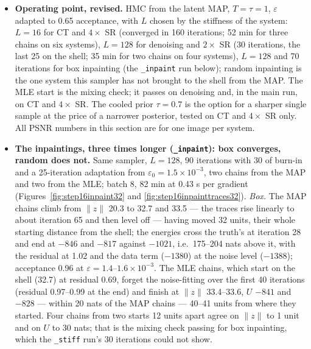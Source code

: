 \documentclass[11pt]{article}
\begin{document}
\begin{itemize}
  \item \textbf{Operating point, revised.} HMC from the latent MAP, $T =
        \tau = 1$, $\varepsilon$ adapted to 0.65 acceptance, with $L$
        chosen by the stiffness of the system: $L = 16$ for CT and
        $4\times$ SR (converged in 160 iterations; 52 min for three chains
        on six systems), $L = 128$ for denoising and $2\times$ SR (30
        iterations, the last 25 on the shell; 35 min for two chains on
        four systems), $L = 128$ and 70 iterations for box inpainting
        (the \texttt{\_inpaint} run below); random inpainting is the one
        system this sampler has not brought to the shell from the MAP. The
        MLE start is the mixing check; it passes on denoising and, in the
        main run, on CT and $4\times$ SR. The cooled prior $\tau = 0.7$ is
        the option for a sharper single sample at the price of a narrower
        posterior, tested on CT and $4\times$ SR only. All PSNR numbers in
        this section are for one image per system.
  \item \textbf{The inpaintings, three times longer (\texttt{\_inpaint}):
        box converges, random does not.} Same sampler, $L = 128$, 90
        iterations with 30 of burn-in and a 25-iteration adaptation from
        $\varepsilon_0 = 1.5 \times 10^{-3}$, two chains from the MAP and
        two from the MLE; batch 8, 82 min at 0.43 s per gradient
        (Figures~\ref{fig:step16inpaint32} and \ref{fig:step16inpainttraces32}).
        \emph{Box.} The MAP chains climb from $\|z\|$ 20.3 to 32.7 and
        33.5 --- the traces rise linearly to about iteration 65 and then
        level off --- having moved 32 units, their whole starting distance
        from the shell; the energies cross the truth's at iteration 28 and
        end at $-846$ and $-817$ against $-1021$, i.e.\ 175--204 nats above
        it, with the residual at 1.02 and the data term ($-1380$) at the
        noise level ($-1388$); acceptance 0.96 at $\varepsilon = 1.4$--$1.6
        \times 10^{-3}$. The MLE chains, which start on the shell (32.7) at
        residual 0.69, forget the noise-fitting over the first 40
        iterations (residual 0.97--0.99 at the end) and finish at $\|z\|$
        33.4--33.6, $U$ $-841$ and $-828$ --- within 20 nats of the MAP
        chains --- 40--41 units from where they started. Four chains from
        two starts 12 units apart agree on $\|z\|$ to 1 unit and on $U$ to
        30 nats; that is the mixing check passing for box inpainting,
        which the \texttt{\_stiff} run's 30 iterations could not show.

\end{itemize}
\end{document}

